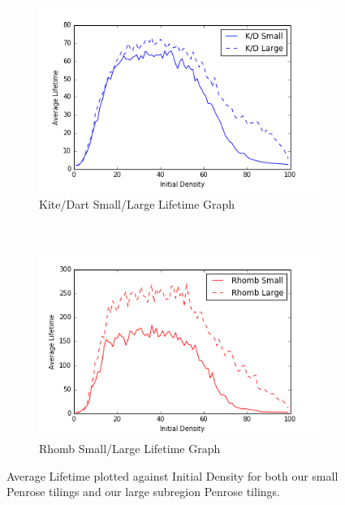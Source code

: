 \documentclass[a4paper,11pt,twoside]{report}
\begin{document}
\begin{figure}[htp]
\centering
	\begin{subfigure}[t]{0.6\textwidth}
	\includegraphics[width=\textwidth]{ch4_figs/ckd_small_large_lifetime}
	\caption{Kite/Dart Small/Large Lifetime Graph}
	\label{fig:ckd_small_large_lifetime}
	\end{subfigure}
~
	\begin{subfigure}[t]{0.6\textwidth}
	\centering
	\includegraphics[width=\textwidth]{ch4_figs/crh_small_large_lifetime}
	\caption{Rhomb Small/Large Lifetime Graph}
	\label{fig:crh_small_large_lifetime}
	\end{subfigure}
\caption[Small/Large Lifetime Graphs]{
	Average Lifetime plotted against Initial Density for both our small Penrose tilings and our large subregion Penrose tilings.
	}
\end{figure}
\end{document}
